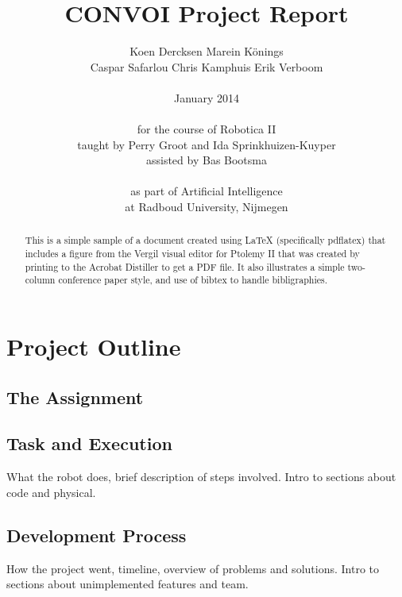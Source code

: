 \documentclass[10pt,twocolumn]{article}
\begin{document}
\title{CONVOI Project Report}

\author{Koen Dercksen \hspace{2em} Marein K\"onings\\
Caspar Safarlou \hspace{2em} Chris Kamphuis \hspace{2em} Erik Verboom\\
\\
January 2014 \\
\\
for the course of Robotica II\\
taught by Perry Groot and Ida Sprinkhuizen-Kuyper\\
assisted by Bas Bootsma \\
\\
as part of Artificial Intelligence\\
at Radboud University, Nijmegen
}

\maketitle
\thispagestyle{empty}

\begin{abstract}
   This is a simple sample of a document created using \LaTeX
   (specifically pdflatex)
   that includes a figure from the Vergil visual editor for Ptolemy II
   that was created by printing to the Acrobat Distiller to get a PDF file.
   It also illustrates a simple two-column conference paper style,
   and use of bibtex to handle bibligraphies.
\end{abstract}

\tableofcontents

\section{Project Outline}

\subsection{The Assignment}

\subsection{Task and Execution}
What the robot does, brief description of steps involved. Intro to sections about code and physical.

\subsection{Development Process}
How the project went, timeline, overview of problems and solutions. Intro to sections about unimplemented features and team.
\end{document}

